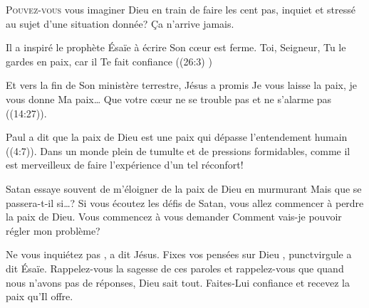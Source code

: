 \lettrine{P}{ouvez-vous} vous imaginer Dieu en train de faire les cent pas,
 inquiet et stressé au sujet d'une situation donnée? Ça n'arrive jamais. 

Il a inspiré le prophète Ésaïe à écrire\frcolon{} 
 \Og Son c\oe{}ur est ferme. Toi, Seigneur, Tu le gardes en paix,
 car il Te fait confiance \Fg{}
 ((26:3) \BFC) 


Et vers la fin de Son ministère terrestre, Jésus a promis\frcolon{}
 \Og Je vous laisse la paix, je vous donne Ma paix\dots{}
 Que votre c\oe{}ur ne se trouble pas et ne s'alarme pas \Fg{}
 ((14:27)). 

Paul a dit que la paix de Dieu est une paix qui dépasse l'entendement humain
 ((4:7)).
 Dans un monde plein de tumulte et de pressions formidables,
 comme il est merveilleux de faire l'expérience d'un tel réconfort! 

Satan essaye souvent de m'éloigner de la paix de Dieu en murmurant\frcolon{}
 \Og Mais que se passera-t-il si\dots{}? \Fg{} 
 Si vous écoutez les défis de Satan, vous allez commencer
 à perdre la paix de Dieu. Vous commencez à vous demander\frcolon{}
 \Og Comment vais-je pouvoir régler mon problème? \Fg{} 

\Og Ne vous inquiétez pas \Fg{}, 
 a dit Jésus.
 \Og Fixes vos 
 pensées sur Dieu \Fg{}, punct{virgule}
 a dit Ésaïe.
 Rappelez-vous la sagesse de ces paroles et rappelez-vous que
 quand nous n'avons pas de réponses, Dieu sait tout.
 Faites-Lui confiance et recevez la paix qu'Il offre.

\dvrule







